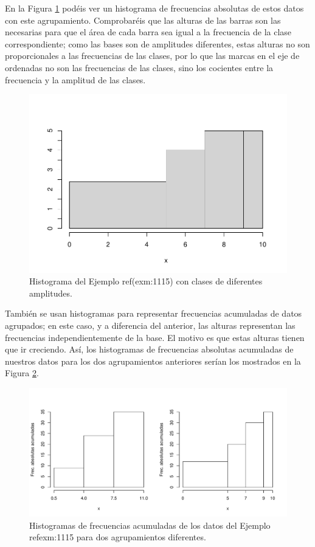 \documentclass[
]{book}
\theoremstyle{definition}
\theoremstyle{definition}
\theoremstyle{definition}
\theoremstyle{remark}
\begin{document}
En la Figura \ref{fig:203} podéis ver un histograma de frecuencias absolutas de estos datos con este agrupamiento. Comprobaréis que las alturas de las barras son las necesarias para que el área de cada barra sea igual a la frecuencia de la clase correspondiente; como las bases son de amplitudes diferentes, estas alturas no son proporcionales a las frecuencias de las clases, por lo que las marcas en el eje de ordenadas no son las frecuencias de las clases, sino los cocientes entre la frecuencia y la amplitud de las clases.

\begin{figure}

{\centering \includegraphics[width=0.5\linewidth]{13chap13_Agrupados_files/figure-latex/203-1} 

}

\caption{Histograma del Ejemplo ref(exm:1115) con clases de diferentes amplitudes.}\label{fig:203}
\end{figure}

También se usan histogramas para representar frecuencias acumuladas de datos agrupados; en este caso, y a diferencia del anterior, las alturas representan las frecuencias independientemente de la base. El motivo es que estas alturas tienen que ir creciendo. Así, los histogramas de frecuencias absolutas acumuladas de nuestros datos para los dos agrupamientos anteriores serían los mostrados en la Figura \ref{fig:204}.

\begin{figure}

{\centering \includegraphics[width=0.9\linewidth]{13chap13_Agrupados_files/figure-latex/204-1} 

}

\caption{Histogramas de frecuencias acumuladas de los datos del Ejemplo \\ref{exm:1115} para dos agrupamientos diferentes.}\label{fig:204}
\end{figure}
\end{document}
